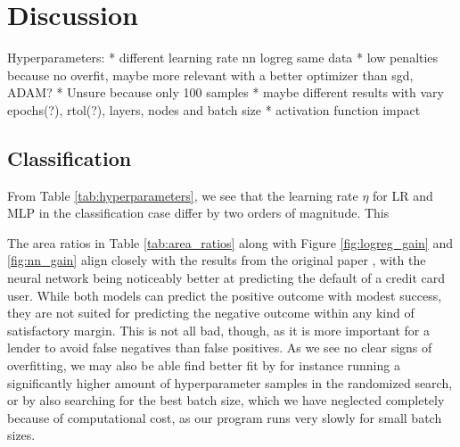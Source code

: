 \documentclass[a4paper, 11pt, twocolumn]{article}
\begin{document}
\section{Discussion}

Hyperparameters:
* different learning rate nn logreg same data
* low penalties because no overfit, maybe more relevant with a better optimizer
than sgd, ADAM?
* Unsure because only 100 samples
* maybe different results with vary epochs(?), rtol(?), layers, nodes and batch size
* activation function impact

\subsection{Classification}
From Table \ref{tab:hyperparameters}, we see that the learning rate $\eta$ for 
LR and MLP in the classification case differ by two orders of magnitude. This 


The area ratios in Table \ref{tab:area_ratios} along with Figure
\ref{fig:logreg_gain} and \ref{fig:nn_gain} align closely
with the results from the original paper \cite{origarticle}, with the neural
network being noticeably better at predicting the default of a credit card user.
While both models can predict the positive outcome with modest success, they are
not suited for predicting the negative outcome within any kind of satisfactory
margin. This is not all bad, though, as it is more important for a lender to avoid
false negatives than false positives. As we see no clear signs of overfitting,
we may also be able find better fit by for instance running a significantly higher
amount of hyperparameter samples in the randomized search, or by also searching
for the best batch size, which we have neglected completely because of computational
cost, as our program runs very slowly for small batch sizes.
\end{document}
